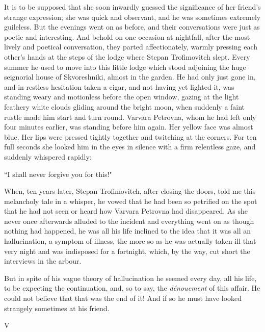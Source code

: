 \documentclass[12pt]{article}
\begin{document}
\vspace{12pt}
It is to be supposed that she soon inwardly guessed the significance of
her friend's strange expression; she was quick and observant, and he was
sometimes extremely guileless. But the evenings went on as before, and
their conversations were just as poetic and interesting. And behold
on one occasion at nightfall, after the most lively and poetical
conversation, they parted affectionately, warmly pressing each other's
hands at the steps of the lodge where Stepan Trofimovitch slept. Every
summer he used to move into this little lodge which stood adjoining the
huge seignorial house of Skvoreshniki, almost in the garden. He had only
just gone in, and in restless hesitation taken a cigar, and not having
yet lighted it, was standing weary and motionless before the open
window, gazing at the light feathery white clouds gliding around the
bright moon, when suddenly a faint rustle made him start and turn
round. Varvara Petrovna, whom he had left only four minutes earlier,
was standing before him again. Her yellow face was almost blue. Her lips
were pressed tightly together and twitching at the corners. For ten full
seconds she looked him in the eyes in silence with a firm relentless
gaze, and suddenly whispered rapidly:


\vspace{12pt}
``I shall never forgive you for this!"


\vspace{12pt}
When, ten years later, Stepan Trofimovitch, after closing the doors,
told me this melancholy tale in a whisper, he vowed that he had been so
petrified on the spot that he had not seen or heard how Varvara Petrovna
had disappeared. As she never once afterwards alluded to the incident
and everything went on as though nothing had happened, he was all his
life inclined to the idea that it was all an hallucination, a symptom
of illness, the more so as he was actually taken ill that very night
and was indisposed for a fortnight, which, by the way, cut short the
interviews in the arbour.


\vspace{12pt}
But in spite of his vague theory of hallucination he seemed every day,
all his life, to be expecting the continuation, and, so to say, the
\emph{dénouement} of this affair. He could not believe that that was the end of
it! And if so he must have looked strangely sometimes at his friend.



\vspace{12pt}
V
\end{document}
